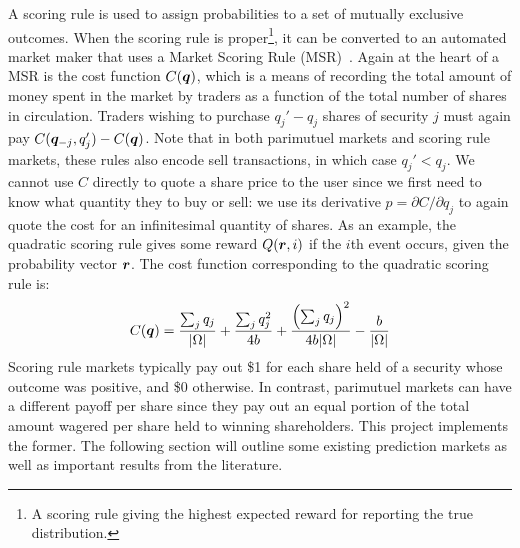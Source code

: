 A scoring rule is used to assign probabilities to a set of mutually exclusive
outcomes. When the scoring rule is proper\footnote{A scoring rule giving the
highest expected reward for reporting the true distribution.}, it can be
converted to an automated market maker that uses a Market Scoring Rule
(MSR)~\cite{Hanson2003}.  Again at the heart of a MSR is the cost function
$C(\bm{q})$, which is a means of recording the total amount of money spent in
the market by traders as a function of the total number of shares in
circulation. Traders wishing to purchase $q_j' - q_j$ shares of security $j$
must again pay $C(\bm{q}_{-j}, q_j')-C(\bm{q})$. Note that in both
parimutuel markets and scoring rule markets, these rules also encode sell
transactions, in which case $q_j' < q_j$. We cannot use $C$ directly to quote a
share price to the user since we first need to know what quantity they to buy
or sell: we use its derivative $p = \partial C / \partial q_j$ to again quote
the cost for an infinitesimal quantity of shares.  As an example, the quadratic
scoring rule gives some reward $Q(\bm{r},i)$ if the $i$th event occurs, given
the probability vector $\bm{r}$. The cost function corresponding to the
quadratic scoring rule is:
%
\[
	C(\bm{q}) =
	\frac{\sum_j q_j}{|\Omega|} + \frac{\sum_j q_j^2}{4b}  +
	\frac{\left( \sum_j q_j \right)^2}{4b|\Omega|} - \frac{b}{|\Omega|}
\]
%
Scoring rule markets typically pay out \$1 for each share held of a security
whose outcome was positive, and \$0 otherwise. In contrast, parimutuel markets
can have a different payoff per share since they pay out an equal portion of
the total amount wagered per share held to winning shareholders. This project
implements the former. The following section will outline some existing
prediction markets as well as important results from the literature.
